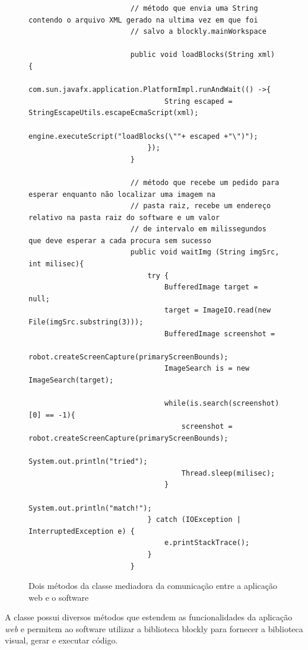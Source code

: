 \documentclass[tg]{mdtufsm}
\begin{document}
                    \begin{figure}[!htb]
                    \begin{lstlisting}
                        // método que envia uma String contendo o arquivo XML gerado na ultima vez em que foi
                        // salvo a blockly.mainWorkspace

                        public void loadBlocks(String xml) {
                            com.sun.javafx.application.PlatformImpl.runAndWait(() ->{
                                String escaped = StringEscapeUtils.escapeEcmaScript(xml);
                                engine.executeScript("loadBlocks(\""+ escaped +"\")");
                            });
                        }

                        // método que recebe um pedido para esperar enquanto não localizar uma imagem na
                        // pasta raiz, recebe um endereço relativo na pasta raiz do software e um valor
                        // de intervalo em milissegundos que deve esperar a cada procura sem sucesso
                        public void waitImg (String imgSrc, int milisec){
                            try {
                                BufferedImage target = null;
                                target = ImageIO.read(new File(imgSrc.substring(3)));
                                BufferedImage screenshot =
                                    robot.createScreenCapture(primaryScreenBounds);
                                ImageSearch is = new ImageSearch(target);

                                while(is.search(screenshot)[0] == -1){
                                    screenshot = robot.createScreenCapture(primaryScreenBounds);
                                    System.out.println("tried");
                                    Thread.sleep(milisec);
                                }
                                System.out.println("match!");
                            } catch (IOException | InterruptedException e) {
                                e.printStackTrace();
                            }
                        }
                    \end{lstlisting}
                        \caption{Dois métodos da classe mediadora da comunicação entre a aplicação web e o software}
                    	\label{code:javascriptmsg.java}
                    \end{figure}

                    A classe possui diversos métodos que estendem as funcionalidades da aplicação \emph{web} e permitem ao software utilizar a biblioteca blockly para fornecer a biblioteca visual, gerar e executar código.
\end{document}
